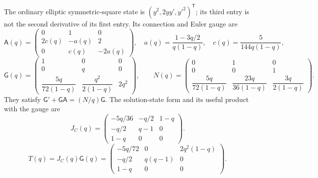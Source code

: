\documentclass[11pt,a4paper]{article}
\begin{document}
The ordinary elliptic symmetric-square state is
\((y^2,2yy',y'^2)^{\mathsf T}\); its third entry is not the second
derivative of its first entry.  Its connection and Euler gauge are
\[
 \mathsf A(q)=\begin{pmatrix}0&1&0\\2c(q)&-a(q)&2\\0&c(q)&-2a(q)\end{pmatrix},
 \quad a(q)=\frac{1-3q/2}{q(1-q)},\quad
 c(q)=\frac{5}{144q(1-q)},
\]
\[
 \mathsf G(q)=\begin{pmatrix}
 1&0&0\\0&q&0\\
 \dfrac{5q}{72(1-q)}&\dfrac{q^2}{2(1-q)}&2q^2
 \end{pmatrix},\qquad
 N(q)=\begin{pmatrix}0&1&0\\0&0&1\\
 \dfrac{5q}{72(1-q)}&\dfrac{23q}{36(1-q)}&\dfrac{3q}{2(1-q)}
 \end{pmatrix}.
\]
They satisfy \(\mathsf G'+\mathsf G\mathsf A=(N/q)\mathsf G\).  The solution-state form and its useful
product with the gauge are
\[
 J_C(q)=\begin{pmatrix}
 -5q/36&-q/2&1-q\\-q/2&q-1&0\\1-q&0&0
 \end{pmatrix}.
\]
\[
 T(q)=J_C(q)\mathsf G(q)=\begin{pmatrix}
 -5q/72&0&2q^2(1-q)\\-q/2&q(q-1)&0\\1-q&0&0
 \end{pmatrix}.
\]
\end{document}
